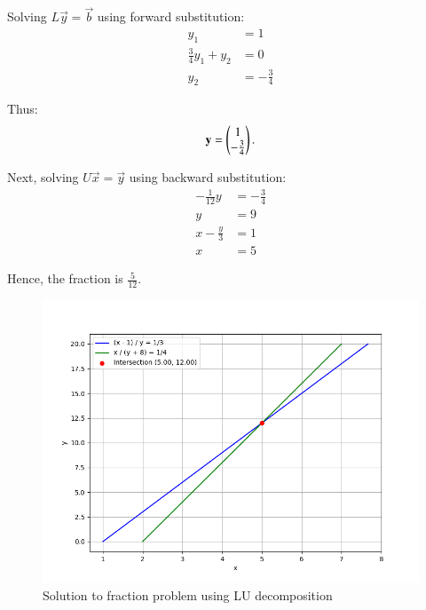 \documentclass[journal]{IEEEtran}
\begin{document}
Solving $L\vec{y} = \vec{b}$ using forward substitution:
\begin{align}
    y_1 &= 1 \\
    \frac{3}{4} y_1 + y_2 &= 0\\
    y_2 &= -\frac{3}{4}
\end{align}

Thus:
\begin{align}
    \mathbf{y} = \begin{pmatrix}1 \\ -\frac{3}{4}\end{pmatrix}.
\end{align}

Next, solving $U\vec{x} = \vec{y}$ using backward substitution:
\begin{align}
    -\frac{1}{12} y &= -\frac{3}{4} \\
    y &= 9\\
    x - \frac{y}{3} &= 1\\
    x &= 5
\end{align}

Hence, the fraction is $\frac{5}{12}$.

\begin{figure}[h!]
   \centering
   \includegraphics[width=1\columnwidth]{figs/fig.png}
    \caption{Solution to fraction problem using LU decomposition}
\end{figure}
\end{document}
